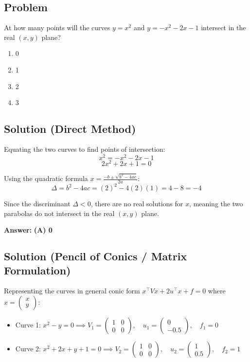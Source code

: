 \documentclass{article}
\begin{document}
\subsection*{Problem}
At how many points will the curves $y=x^{2}$ and $y=-x^{2}-2x-1$ intersect in the real $(x, y)$ plane?
\begin{enumerate}
    \item[(A)] 0
    \item[(B)] 1
    \item[(C)] 2
    \item[(D)] 3
\end{enumerate}

\subsection*{Solution (Direct Method)}
Equating the two curves to find points of intersection:
\[
x^{2} = -x^{2} - 2x - 1
\]
\[
2x^{2} + 2x + 1 = 0
\]

Using the quadratic formula $x = \frac{-b \pm \sqrt{b^{2} - 4ac}}{2a}$:
\[
\Delta = b^{2} - 4ac = (2)^{2} - 4(2)(1) = 4 - 8 = -4
\]

Since the discriminant $\Delta < 0$, there are no real solutions for $x$, meaning the two parabolas do not intersect in the real $(x, y)$ plane.

\textbf{Answer:} \textbf{(A) 0}

\subsection*{Solution (Pencil of Conics / Matrix Formulation)}
Representing the curves in general conic form $x^{\top}Vx + 2u^{\top}x + f = 0$ where $x = \begin{pmatrix} x \\ y \end{pmatrix}$:

\begin{itemize}
    \item Curve 1: $x^2 - y = 0 \implies V_1 = \begin{pmatrix}1 & 0\\0 & 0\end{pmatrix}, \quad u_1 = \begin{pmatrix}0\\-0.5\end{pmatrix}, \quad f_1 = 0$
    \item Curve 2: $x^2 + 2x + y + 1 = 0 \implies V_2 = \begin{pmatrix}1 & 0\\0 & 0\end{pmatrix}, \quad u_2 = \begin{pmatrix}1\\0.5\end{pmatrix}, \quad f_2 = 1$
\end{itemize}
\end{document}
